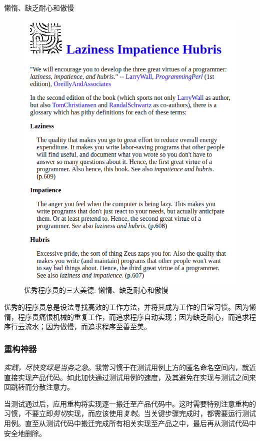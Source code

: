 \begin{content}
\begin{episode}{懒惰、缺乏耐心和傲慢}
\begin{content}
\begin{figure}[H]
\centering
\includegraphics[width=1.0\textwidth]{figures/xunit/larry-wall.png}
\caption{优秀程序员的三大美德: 懒惰、缺乏耐心和傲慢}
 \label{fig:larry-wall}
\end{figure}

优秀的程序员总是设法寻找高效的工作方法，并将其成为工作的日常习惯。因为懒惰，程序员痛恨机械的重复工作，而追求程序自动实现；因为缺乏耐心，而追求程序行云流水；因为傲慢，而追求程序至善至美。

\subsubsection{重构神器}

\emph{实践，尽快变绿是当务之急}。我常习惯于在测试用例上方的匿名命名空间内，就近直接实现产品代码。如此加快通过测试用例的速度，及其避免在实现与测试之间来回跳转而分散注意力。

当测试通过后，应用重构将实现逐一搬迁至产品代码中。这时需要特别注意重构的习惯，不要立即\emph{剪切}实现，而应该使用\emph{复制}。当关键步骤完成时，都需要运行测试用例。直至从测试代码中搬迁完成所有相关实现至产品之中，最后再从测试代码中安全地删除。


\end{content}
\end{episode}
\end{content}
